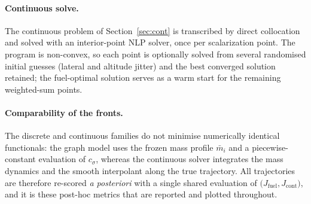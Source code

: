 \paragraph{Continuous solve.}
The continuous problem of Section~\ref{sec:cont} is transcribed by direct
collocation and solved with an interior-point NLP solver, once per scalarization
point. The program is non-convex, so each point is optionally solved from
several randomised initial guesses (lateral and altitude jitter) and the best
converged solution retained; the fuel-optimal solution serves as a warm start
for the remaining weighted-sum points.

\paragraph{Comparability of the fronts.}
The discrete and continuous families do not minimise numerically identical
functionals: the graph model uses the frozen mass profile $\bar m_i$ and a
piecewise-constant evaluation of $c_\sigma$, whereas the continuous solver
integrates the mass dynamics and the smooth interpolant along the true
trajectory. All trajectories are therefore re-scored \emph{a posteriori} with a
single shared evaluation of $\bigl(J_{\mathrm{fuel}},J_{\mathrm{cont}}\bigr)$,
and it is these post-hoc metrics that are reported and plotted throughout.


